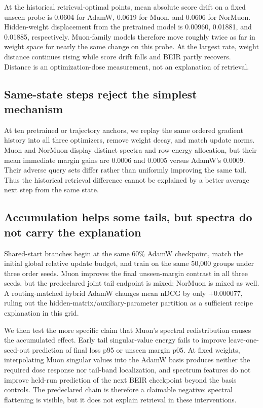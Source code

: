\documentclass[11pt]{article}
\begin{document}
At the historical retrieval-optimal points, mean absolute score drift on a fixed unseen probe is
0.0604 for AdamW, 0.0619 for Muon, and 0.0606 for NorMuon. Hidden-weight displacement from the
pretrained model is 0.00960, 0.01881, and 0.01885, respectively. Muon-family models therefore move
roughly twice as far in weight space for nearly the same change on this probe. At the largest rate,
weight distance continues rising while score drift falls and BEIR partly recovers. Distance is an
optimization-dose measurement, not an explanation of retrieval.

\subsection{Same-state steps reject the simplest mechanism}

At ten pretrained or trajectory anchors, we replay the same ordered gradient history into all three
optimizers, remove weight decay, and match update norms. Muon and NorMuon display distinct spectra
and row-energy allocation, but their mean immediate margin gains are 0.0006 and 0.0005 versus
AdamW's 0.0009. Their adverse query sets differ rather than uniformly improving the same tail.
Thus the historical retrieval difference cannot be explained by a better average next step from the
same state.

\CommonStateHeadline



\subsection{Accumulation helps some tails, but spectra do not carry the explanation}

Shared-start branches begin at the same 60\% AdamW checkpoint, match the initial global relative
update budget, and train on the same 50,000 groups under three order seeds. Muon improves the final
unseen-margin contrast in all three seeds, but the predeclared joint tail endpoint is mixed; NorMuon
is mixed as well. A routing-matched hybrid AdamW changes mean nDCG by only $+0.000077$, ruling out
the hidden-matrix/auxiliary-parameter partition as a sufficient recipe explanation in this grid.

\InterventionHeadline



We then test the more specific claim that Muon's spectral redistribution causes the accumulated
effect. Early tail singular-value energy fails to improve leave-one-seed-out prediction of final
loss p95 or unseen margin p05. At fixed weights, interpolating Muon singular values into the AdamW
basis produces neither the required dose response nor tail-band localization, and spectrum features
do not improve held-run prediction of the next BEIR checkpoint beyond the basis controls. The
predeclared chain is therefore a claimable negative: spectral flattening is visible, but it does not
explain retrieval in these interventions.
\end{document}
